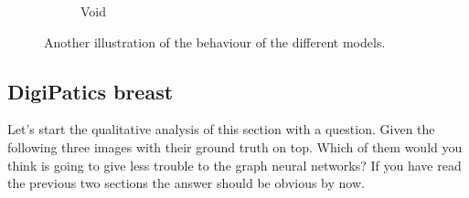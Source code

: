 \begin{figure}[H]
\begin{subfigure}[b]{0.45\textwidth}
    \caption{Void}
    \label{fig:monusac-void3}
  \end{subfigure}
  \caption{Another illustration of the behaviour of the different models.}
  \label{fig:monusac-qual3}
\end{figure}


\subsection{DigiPatics breast}

Let's start the qualitative analysis of this section with a question. Given the following three images with their ground truth on top. Which of them would you think is going to give less trouble to the graph neural networks? If you have read the previous two sections the answer should be obvious by now.

